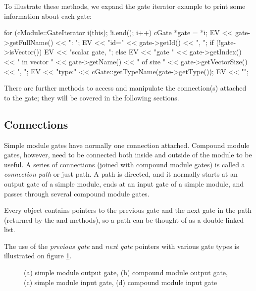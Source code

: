 To illustrate these methods, we expand the gate iterator example
to print some information about each gate:

\begin{cpp}
for (cModule::GateIterator i(this); !i.end(); i++) {
    cGate *gate = *i;
    EV << gate->getFullName() << ": ";
    EV << "id=" << gate->getId() << ", ";
    if (!gate->isVector())
        EV << "scalar gate, ";
    else
        EV << "gate " << gate->getIndex()
           << " in vector " << gate->getName()
           << " of size " << gate->getVectorSize() << ", ";
    EV << "type:" << cGate::getTypeName(gate->getType());
    EV << "\n";
}
\end{cpp}

There are further  methods to access and manipulate
the connection(s) attached to the gate; they will be covered in the
following sections.


\subsection{Connections}
\label{sec:simple-modules:connections}

Simple module gates have normally one connection attached. Compound module
gates, however, need to be connected both inside and outside of the
module to be useful. A series of connections (joined with compound
module gates) is called a \textit{connection path} or just path.
A path is directed, and it normally starts at an output gate of
a simple module, ends at an input gate of a simple module,
and passes through several compound module gates.

Every  object contains pointers to the previous gate
and the next gate in the path (returned by the 
and  methods), so a path can be thought of as
a double-linked list.

The use of the \textit{previous gate} and \textit{next gate} pointers
with various gate types is illustrated on figure
\ref{fig:ch-simple-modules:gates}.

\begin{figure}[htbp]
  \begin{center}
    
    \caption{(a) simple module output gate, (b) compound module output gate,
             (c) simple module input gate, (d) compound module input gate}
    \label{fig:ch-simple-modules:gates}
  \end{center}
\end{figure}

